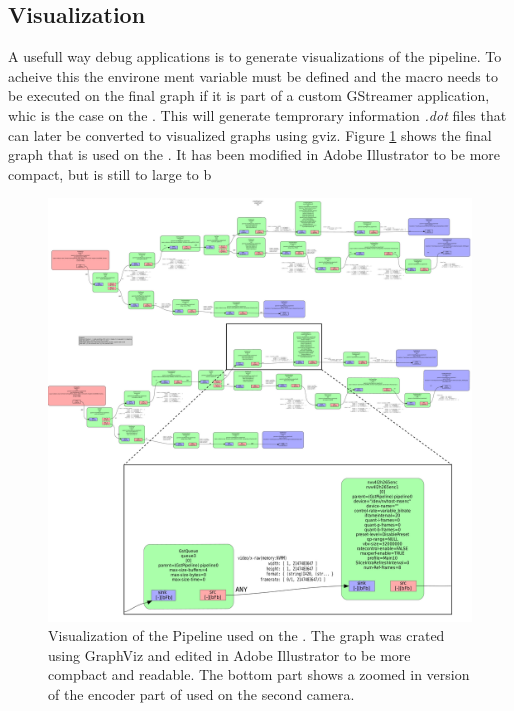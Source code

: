 \subsection{Visualization}
A usefull way debug \gs applications is to generate visualizations of the pipeline.
To acheive this the environe ment variable  must be defined and the  macro needs to be executed on the final graph if it is part of a custom GStreamer application, whic is the case on the \sr.
\cite{johnstonGeneratingGStreamerPipeline2018}
This will generate temprorary information \textit{.dot} files that can later be converted to visualized graphs using \gls{gviz}.
Figure \ref{fig:gs_pipeline_visualization} shows the final graph that is used on the \sr.
It has been modified in Adobe Illustrator to be more compact, but is still to large to b




\begin{figure}[H]
    \centering
    \includegraphics[width=\textwidth]{figures/pipeline.pdf}
    \caption{Visualization of the \gs Pipeline used on the \sr.
        The graph was crated using GraphViz and edited in Adobe Illustrator to be more compbact and readable. The bottom part shows a zoomed in version of the encoder part of used on the second camera.}
    \label{fig:gs_pipeline_visualization}
\end{figure}
